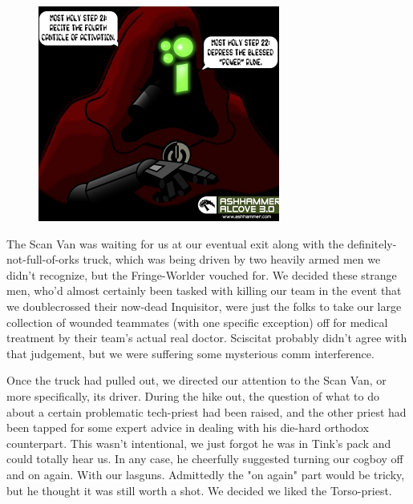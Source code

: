 \begin{figure}
	\begin{center}
		\includegraphics[width=\figwidth]{pics/19/8.png}
	\end{center}
\end{figure}
The Scan Van was waiting for us at our eventual exit along with the definitely-not-full-of-orks truck, which was being driven by two heavily armed men we didn't recognize, but the Fringe-Worlder vouched for. 
We decided these strange men, who'd almost certainly been tasked with killing our team in the event that we doublecrossed their now-dead Inquisitor, were just the folks to take our large collection of wounded teammates (with one specific exception) off for medical treatment by their team's actual real doctor. 
Sciscitat probably didn't agree with that judgement, but we were suffering some mysterious comm interference.

Once the truck had pulled out, we directed our attention to the Scan Van, or more specifically, its driver. 
During the hike out, the question of what to do about a certain problematic tech-priest had been raised, and the other priest had been tapped for some expert advice in dealing with his die-hard orthodox counterpart. 
This wasn't intentional, we just forgot he was in Tink's pack and could totally hear us. 
In any case, he cheerfully suggested turning our cogboy off and on again. 
With our lasguns. 
Admittedly the "on again" part would be tricky, but he thought it was still worth a shot. 
We decided we liked the Torso-priest.

